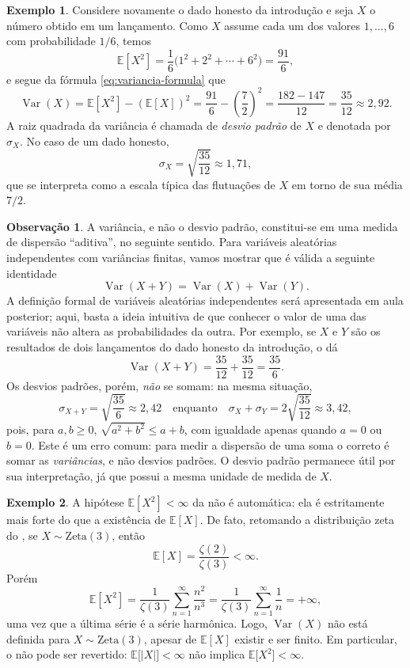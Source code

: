 \documentclass[12pt,portuguese]{article}
\theoremstyle{definition}
\newtheorem{example}[example]{Exemplo}
\newtheorem{remark}[remark]{Observação}
\begin{document}
\begin{example}\label{ex:dado-variancia}
Considere novamente o dado honesto da introdução e seja $X$ o número obtido
em um lançamento. Como $X$ assume cada um dos valores $1, \ldots, 6$ com
probabilidade $1/6$, temos
\[
\mathbb{E}[X^2] = \frac{1}{6}\bigl(1^2 + 2^2 + \cdots + 6^2\bigr) = \frac{91}{6},
\]
e segue da fórmula \eqref{eq:variancia-formula} que
\[
\operatorname{Var}(X) = \mathbb{E}[X^2] - (\mathbb{E}[X])^2
= \frac{91}{6} - \left(\frac{7}{2}\right)^2
= \frac{182 - 147}{12}
= \frac{35}{12}
\approx 2{,}92.
\]
A raiz quadrada da variância é chamada de \emph{desvio padrão} de $X$ e
denotada por $\sigma_X$. No caso de um dado honesto,
\[
\sigma_X = \sqrt{\frac{35}{12}} \approx 1{,}71,
\]
que se interpreta como a escala típica das flutuações de $X$ em torno de sua
média $7/2$.
\end{example}

\begin{remark}
A variância, e não o desvio padrão, constitui-se em uma medida de dispersão ``aditiva'',
no seguinte sentido. Para variáveis aleatórias independentes com
variâncias finitas, vamos mostrar que é válida a seguinte identidade
\[
\operatorname{Var}(X+Y) = \operatorname{Var}(X) + \operatorname{Var}(Y).
\]
A definição formal de variáveis aleatórias independentes será apresentada em
aula posterior; aqui, basta a ideia intuitiva de que conhecer o valor de uma
das variáveis não altera as probabilidades da outra. Por exemplo, se $X$ e $Y$
são os resultados de dois lançamentos do dado honesto da introdução, o
 dá
\[
\operatorname{Var}(X+Y) = \frac{35}{12} + \frac{35}{12} = \frac{35}{6}.
\]
Os desvios padrões, porém, \emph{não} se somam: na mesma situação,
\[
\sigma_{X+Y} = \sqrt{\frac{35}{6}} \approx 2{,}42
\quad\text{enquanto}\quad
\sigma_X + \sigma_Y = 2\sqrt{\frac{35}{12}} \approx 3{,}42,
\]
pois, para $a, b \geqslant 0$, $\sqrt{a^2+b^2} \leqslant a+b$, com igualdade
apenas quando $a=0$ ou $b=0$. Este é um erro comum: para medir a dispersão de
uma soma o correto é somar as \emph{variâncias}, e não desvios padrões. O desvio padrão
permanece útil por sua interpretação, já que possui a mesma unidade de medida
de $X$.
\end{remark}

\begin{example}\label{ex:zeta3-variancia-infinita}
A hipótese $\mathbb{E}[X^2] < \infty$ da  não é
automática: ela é estritamente mais forte do que a existência de
$\mathbb{E}[X]$. De fato, retomando a distribuição zeta do
, se $X \sim \mathrm{Zeta}(3)$, então
\[
\mathbb{E}[X] = \frac{\zeta(2)}{\zeta(3)} < \infty.
\]
Porém
\[
\mathbb{E}[X^2]
= \frac{1}{\zeta(3)} \sum_{n=1}^{\infty} \frac{n^2}{n^3}
= \frac{1}{\zeta(3)} \sum_{n=1}^{\infty} \frac{1}{n}
= +\infty,
\]
uma vez que a última série é a série harmônica. Logo,
$\operatorname{Var}(X)$ não está definida para $X \sim \mathrm{Zeta}(3)$,
apesar de $\mathbb{E}[X]$ existir e ser finito. Em particular, o
 não pode ser revertido:
$\mathbb{E}\bigl[|X|\bigr] < \infty$ não implica
$\mathbb{E}\bigl[X^2\bigr] < \infty$.
\end{example}
\end{document}
